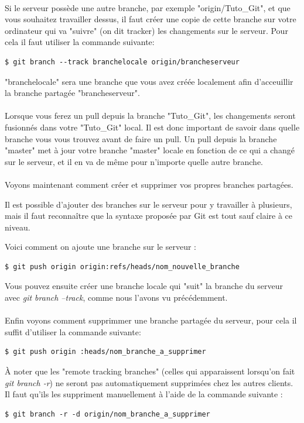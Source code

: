 \documentclass[french, a4paper, 12pt, titlepage]{article}
\begin{document}
\paragraph{}Si le serveur possède une autre branche, par exemple "origin/Tuto\_Git", et que vous souhaitez travailler dessus, il faut créer une copie de cette branche sur votre ordinateur qui va "suivre" (on dit tracker) les changements sur le serveur. Pour cela il faut utiliser la commande suivante:
\begin{lstlisting}
$ git branch --track branchelocale origin/brancheserveur
\end{lstlisting}
"branchelocale" sera une branche que vous avez créée localement afin d'acceuillir la branche partagée "brancheserveur".

\paragraph{}Lorsque vous ferez un pull depuis la branche "Tuto\_Git", les changements seront fusionnés dans votre "Tuto\_Git" local. Il est donc important de savoir dans quelle branche vous vous trouvez avant de faire un pull. Un pull depuis la branche "master" met à jour votre branche "master" locale en fonction de ce qui a changé sur le serveur, et il en va de même pour n’importe quelle autre branche.

\paragraph{}Voyons maintenant comment créer et supprimer vos propres branches partagées.

Il est possible d’ajouter des branches sur le serveur pour y travailler à plusieurs, mais il faut reconnaître que la syntaxe proposée par Git est tout sauf claire à ce niveau.

Voici comment on ajoute une branche sur le serveur :
\begin{lstlisting}
$ git push origin origin:refs/heads/nom_nouvelle_branche
\end{lstlisting}
Vous pouvez ensuite créer une branche locale qui "suit" la branche du serveur avec \emph{git branch --track}, comme nous l’avons vu précédemment.

\paragraph{}Enfin voyons comment supprimmer une branche partagée du serveur, pour cela il suffit d'utiliser la commande suivante:
\begin{lstlisting}
$ git push origin :heads/nom_branche_a_supprimer
\end{lstlisting}
À noter que les "remote tracking branches" (celles qui apparaissent lorsqu’on fait  \emph{git branch -r}) ne seront pas automatiquement supprimées chez les autres clients. Il faut qu’ils les suppriment manuellement à l’aide de la commande suivante :
\begin{lstlisting}
$ git branch -r -d origin/nom_branche_a_supprimer
\end{lstlisting}
\end{document}
